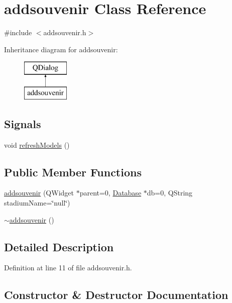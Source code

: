 \hypertarget{classaddsouvenir}{}\section{addsouvenir Class Reference}
\label{classaddsouvenir}


{\ttfamily \#include $<$addsouvenir.\+h$>$}

Inheritance diagram for addsouvenir\+:\begin{figure}[H]
\begin{center}
\leavevmode
\includegraphics[height=2.000000cm]{classaddsouvenir}
\end{center}
\end{figure}
\subsection*{Signals}
\begin{DoxyCompactItemize}
\item 
void \hyperlink{classaddsouvenir_a4075c8409ec8fe021609d8eedc7e316e}{refresh\+Models} ()
\end{DoxyCompactItemize}
\subsection*{Public Member Functions}
\begin{DoxyCompactItemize}
\item 
\hyperlink{classaddsouvenir_a9c6589d61f31a2bcae2ba6f439b19f20}{addsouvenir} (Q\+Widget $\ast$parent=0, \hyperlink{class_database}{Database} $\ast$db=0, Q\+String stadium\+Name=\char`\"{}null\char`\"{})
\item 
\hyperlink{classaddsouvenir_ad8a758c4ee2056d4b3847a4635810c4e}{$\sim$addsouvenir} ()
\end{DoxyCompactItemize}


\subsection{Detailed Description}


Definition at line 11 of file addsouvenir.\+h.



\subsection{Constructor \& Destructor Documentation}
